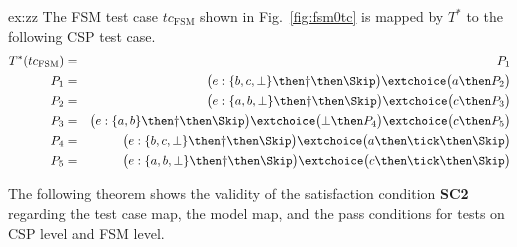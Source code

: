 \begin{example}{ex:zz}
The FSM test case $tc_\text{FSM}$
shown in Fig.~\ref{fig:fsm0tc} is mapped by $T^*$ to the following
CSP test case.
\begin{eqnarray*}
T^*(tc_\text{FSM}) & = & P_1
\\
P_1 & = & \big(e:\{ b,c,\bot \}   \then \dag\then\Skip\big)
\extchoice
 \big( a \then P_2 \big)
\\
P_2 & = & \big( e : \{ a,b,\bot \} \then \dag\then\Skip  \big)
\extchoice
\big( c\then P_3 \big)
\\
P_3 & = & \big( e : \{ a,b \} \then \dag\then\Skip  \big)
\extchoice
\big( \bot \then P_4 \big)
\extchoice
\big( c\then P_5 \big)
\\
P_4 & = & \big( e : \{ b,c,\bot \} \then \dag\then\Skip  \big)
\extchoice
\big( a\then\tick\then \Skip \big)
\\
P_5 & = & \big( e : \{ a,b,\bot \} \then \dag\then\Skip  \big)
\extchoice
\big( c\then\tick\then \Skip \big)
\end{eqnarray*}
\end{example}

The following theorem shows the validity of the satisfaction condition {\bf SC2}
regarding the test case map, the model map, and the pass conditions for tests on CSP level and FSM level.


